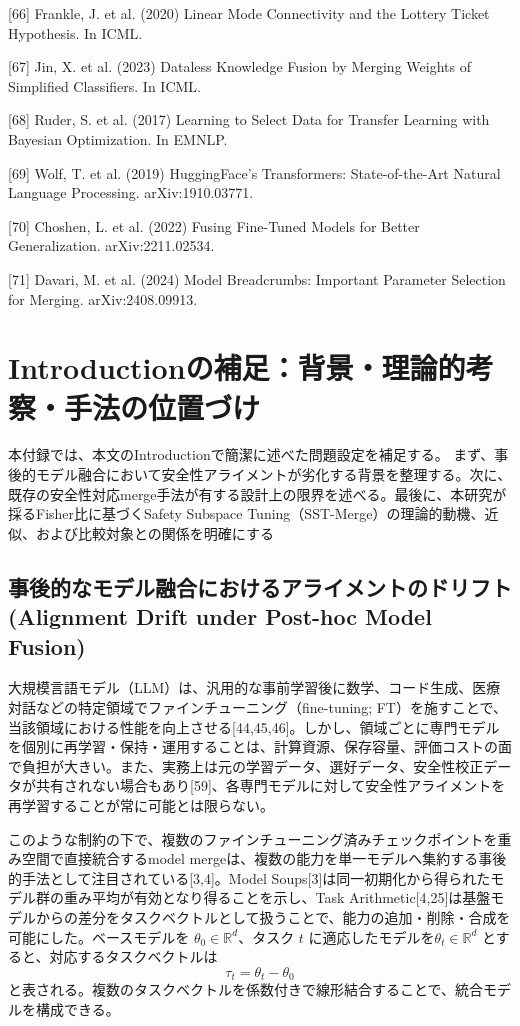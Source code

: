 \documentclass{article}
\begin{document}
{[66] Frankle, J. et al. (2020) Linear Mode Connectivity and the Lottery Ticket Hypothesis. In ICML.

[67] Jin, X. et al. (2023) Dataless Knowledge Fusion by Merging Weights of Simplified Classifiers. In ICML.

[68] Ruder, S. et al. (2017) Learning to Select Data for Transfer Learning with Bayesian Optimization. In EMNLP.

[69] Wolf, T. et al. (2019) HuggingFace's Transformers: State-of-the-Art Natural Language Processing. arXiv:1910.03771.

[70] Choshen, L. et al. (2022) Fusing Fine-Tuned Models for Better Generalization. arXiv:2211.02534.

[71] Davari, M. et al. (2024) Model Breadcrumbs: Important Parameter Selection for Merging. arXiv:2408.09913.
}


\newpage
\appendix

\section{Introductionの補足：背景・理論的考察・手法の位置づけ}
\label{app:introduction}
本付録では、本文のIntroductionで簡潔に述べた問題設定を補足する。
まず、事後的モデル融合において安全性アライメントが劣化する背景を整理する。次に、既存の安全性対応merge手法が有する設計上の限界を述べる。最後に、本研究が採るFisher比に基づくSafety Subspace Tuning（SST-Merge）の理論的動機、近似、および比較対象との関係を明確にする

\subsection{事後的なモデル融合におけるアライメントのドリフト(Alignment Drift under Post-hoc Model Fusion)}
大規模言語モデル（LLM）は、汎用的な事前学習後に数学、コード生成、医療対話などの特定領域でファインチューニング（fine-tuning; FT）を施すことで、当該領域における性能を向上させる[44,45,46]。しかし、領域ごとに専門モデルを個別に再学習・保持・運用することは、計算資源、保存容量、評価コストの面で負担が大きい。また、実務上は元の学習データ、選好データ、安全性校正データが共有されない場合もあり[59]、各専門モデルに対して安全性アライメントを再学習することが常に可能とは限らない。

このような制約の下で、複数のファインチューニング済みチェックポイントを重み空間で直接統合するmodel mergeは、複数の能力を単一モデルへ集約する事後的手法として注目されている[3,4]。Model Soups[3]は同一初期化から得られたモデル群の重み平均が有効となり得ることを示し、Task Arithmetic[4,25]は基盤モデルからの差分をタスクベクトルとして扱うことで、能力の追加・削除・合成を可能にした。ベースモデルを
\(\theta_0 \in \mathbb{R}^d\)、タスク \(t\) に適応したモデルを\(\theta_t \in \mathbb{R}^d\) とすると、対応するタスクベクトルは
\[
\tau_t = \theta_t - \theta_0
\]
と表される。複数のタスクベクトルを係数付きで線形結合することで、統合モデルを構成できる。
\end{document}

